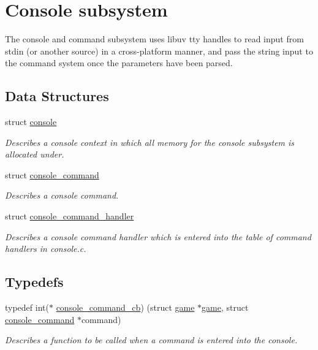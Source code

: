 \hypertarget{group__console}{}\section{Console subsystem}
\label{group__console}


The console and command subsystem uses libuv tty handles to read input from stdin (or another source) in a cross-\/platform manner, and pass the string input to the command system once the parameters have been parsed.  


\subsection*{Data Structures}
\begin{DoxyCompactItemize}
\item 
struct \hyperlink{structconsole}{console}
\begin{DoxyCompactList}\small\item\em Describes a console context in which all memory for the console subsystem is allocated under. \end{DoxyCompactList}\item 
struct \hyperlink{structconsole__command}{console\+\_\+command}
\begin{DoxyCompactList}\small\item\em Describes a console command. \end{DoxyCompactList}\item 
struct \hyperlink{structconsole__command__handler}{console\+\_\+command\+\_\+handler}
\begin{DoxyCompactList}\small\item\em Describes a console command handler which is entered into the table of command handlers in {\itshape console.\+c}. \end{DoxyCompactList}\end{DoxyCompactItemize}
\subsection*{Typedefs}
\begin{DoxyCompactItemize}
\item 
\hypertarget{group__console_ga15a89293092907a5f16a723ac26c123f}{}typedef int($\ast$ \hyperlink{group__console_ga15a89293092907a5f16a723ac26c123f}{console\+\_\+command\+\_\+cb}) (struct \hyperlink{structgame}{game} $\ast$\hyperlink{structgame}{game}, struct \hyperlink{structconsole__command}{console\+\_\+command} $\ast$command)\label{group__console_ga15a89293092907a5f16a723ac26c123f}

\begin{DoxyCompactList}\small\item\em Describes a function to be called when a command is entered into the console. \end{DoxyCompactList}\end{DoxyCompactItemize}
